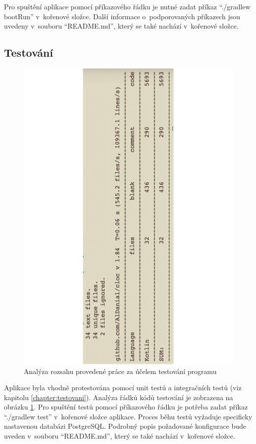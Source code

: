         Pro spuštění aplikace pomocí příkazového řádku je nutné zadat příkaz \enquote{./gradlew bootRun} v~kořenové složce. Další informace o~podporovaných příkazech jsou uvedeny v~souboru \enquote{README.md}, který se také nachází v~kořenové složce. 
        
    \subsection{Testování}
        \begin{figure}\centering
    	   \includegraphics[angle=-90, width=1.0\textwidth]{pdfs/CodeAmountTests2}
    	   \caption[Analýza kódu testů]{Analýza rozsahu provedené práce za účelem testování programu}\label{image:code-count-test}
        \end{figure}
        Aplikace byla vhodně protestována pomocí unit testů a integračních testů (viz kapitolu \ref{chapter:testovani}). Analýza řádků kódů testování je zobrazena na obrázku \ref{image:code-count-test}. Pro spuštění testů pomocí příkazového řádku je potřeba zadat příkaz \enquote{./gradlew test} v~kořenové složce aplikace. Proces běhu testů vyžaduje specificky nastavenou databázi PostgreSQL.
        Podrobný popis požadované konfigurace bude uveden v~souboru \enquote{README.md}, který se také nachází v~kořenové složce.
